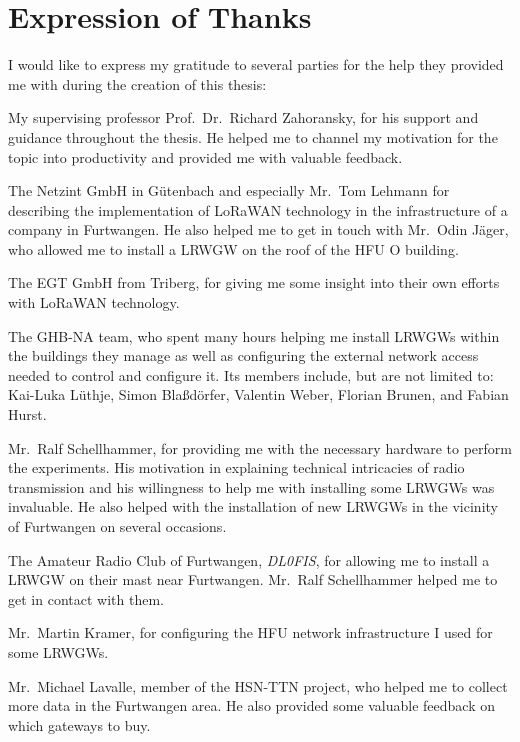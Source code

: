 \section{Expression of Thanks}\label{sec:expression-of-thanks}

I would like to express my gratitude to several parties for the help they provided me with during the creation of this thesis:

My supervising professor Prof.\ Dr.\ Richard Zahoransky, for his support and guidance throughout the thesis.
He helped me to channel my motivation for the topic into productivity and provided me with valuable feedback.

The Netzint GmbH in Gütenbach and especially Mr.\ Tom Lehmann for describing the implementation of \ac{LoRaWAN} technology in the infrastructure of a company in Furtwangen.
He also helped me to get in touch with Mr.\ Odin Jäger, who allowed me to install a \acl{LRWGW} on the roof of the \ac{HFU} O building.

The EGT GmbH from Triberg, for giving me some insight into their own efforts with \ac{LoRaWAN} technology.

The \acl{GHB-NA} team, who spent many hours helping me install \aclp{LRWGW} within the buildings they manage as well as configuring the external network access needed to control and configure it.
Its members include, but are not limited to: Kai-Luka Lüthje, Simon Blaßdörfer, Valentin Weber, Florian Brunen, and Fabian Hurst.

Mr.\ Ralf Schellhammer, for providing me with the necessary hardware to perform the experiments.
His motivation in explaining technical intricacies of radio transmission and his willingness to help me with installing some \aclp{LRWGW} was invaluable.
He also helped with the installation of new \aclp{LRWGW} in the vicinity of Furtwangen on several occasions.

The Amateur Radio Club of Furtwangen, \emph{DL0FIS}, for allowing me to install a \acl{LRWGW} on their mast near Furtwangen.
Mr.\ Ralf Schellhammer helped me to get in contact with them.

Mr.\ Martin Kramer, for configuring the \ac{HFU} network infrastructure I used for some \aclp{LRWGW}.

Mr.\ Michael Lavalle, member of the \ac{HSN-TTN} project, who helped me to collect more data in the Furtwangen area.
He also provided some valuable feedback on which gateways to buy.


